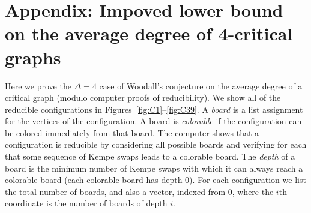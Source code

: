 \documentclass[12pt]{article}
\theoremstyle{plain}
\theoremstyle{definition}
\theoremstyle{remark}
\begin{document}
%




\clearpage
\section*{Appendix: Impoved lower bound on the average degree of 4-critical graphs}
Here we prove the $\Delta=4$ case of Woodall's conjecture
\cite{woodall2008average} on the average degree of a critical graph (modulo
computer proofs of reducibility).  We show all of the reducible configurations
in Figures~\ref{fig:C1}--\ref{fig:C39}.  A \emph{board} is a list assignment for
the vertices of the configuration.  A board is \emph{colorable} if the
configuration can be colored immediately from that board.  The computer shows
that a configuration is reducible by considering all possible boards and
verifying for each that some sequence of Kempe swaps leads to a colorable board.
The \emph{depth} of a board is the minimum number of Kempe swaps with which it
can always reach a colorable board (each colorable board has depth 0).
For each configuration we list the total number of boards, and also a vector,
indexed from 0, where the $i$th coordinate is the number of boards of depth $i$.
\end{document}
